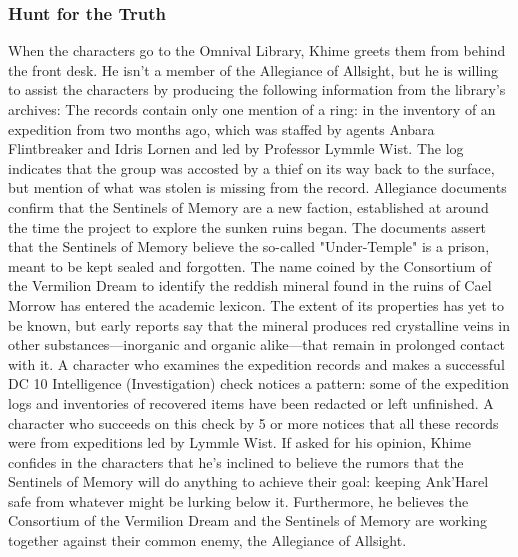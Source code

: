 \documentclass[10pt,a4,twoside,twocolumn,openany,nodeprecatedcode]{dndbook}
\begin{document}
\subsubsection{Hunt for the Truth}
When the characters go to the Omnival Library, Khime greets them from behind the front desk. He isn't a member of the Allegiance of Allsight, but he is willing to assist the characters by producing the following information from the library's archives:
{{The records contain only one mention of a ring: in the inventory of an expedition from two months ago, which was staffed by agents Anbara Flintbreaker and Idris Lornen and led by Professor Lymmle Wist. The log indicates that the group was accosted by a thief on its way back to the surface, but mention of what was stolen is missing from the record.}}
{{Allegiance documents confirm that the Sentinels of Memory are a new faction, established at around the time the project to explore the sunken ruins began. The documents assert that the Sentinels of Memory believe the so-called "Under-Temple" is a prison, meant to be kept sealed and forgotten.}}
{{The name coined by the Consortium of the Vermilion Dream to identify the reddish mineral found in the ruins of Cael Morrow has entered the academic lexicon. The extent of its properties has yet to be known, but early reports say that the mineral produces red crystalline veins in other substances—inorganic and organic alike—that remain in prolonged contact with it.}}
A character who examines the expedition records and makes a successful DC 10 Intelligence (Investigation) check notices a pattern: some of the expedition logs and inventories of recovered items have been redacted or left unfinished. A character who succeeds on this check by 5 or more notices that all these records were from expeditions led by Lymmle Wist.
If asked for his opinion, Khime confides in the characters that he's inclined to believe the rumors that the Sentinels of Memory will do anything to achieve their goal: keeping Ank'Harel safe from whatever might be lurking below it. Furthermore, he believes the Consortium of the Vermilion Dream and the Sentinels of Memory are working together against their common enemy, the Allegiance of Allsight.
\end{document}
